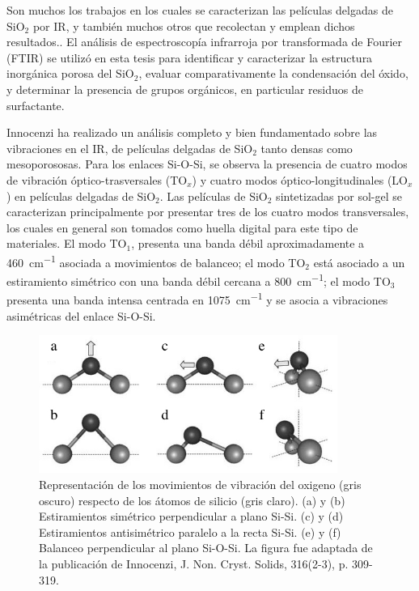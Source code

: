 		 Son muchos los trabajos en los cuales se caracterizan las películas delgadas de SiO$_2$ por IR\cite{Olsen1989,Almeida1990,Redol1997,Innocenzi2003}, y también muchos otros que recolectan y emplean dichos resultados.\cite{Angelome2008,Calvo2008,Calvo20210}.
		 El análisis de espectroscopía infrarroja por transformada de Fourier (FTIR) se utilizó en esta tesis para identificar y caracterizar la estructura inorgánica porosa del SiO$_2$, evaluar comparativamente la condensación del óxido, y determinar la presencia de grupos orgánicos, en particular residuos de surfactante. 

		 Innocenzi ha realizado un análisis completo y bien fundamentado sobre las vibraciones en el IR, de películas delgadas de SiO$_2$ tanto densas como mesoporososas.\cite{Innocenzi2003} Para los enlaces Si-O-Si, se observa la presencia de cuatro modos de vibración óptico-trasversales (TO$_x$) y cuatro modos óptico-longitudinales (LO$_x$) en películas delgadas de SiO$_2$. Las películas de SiO$_2$ sintetizadas por sol-gel se caracterizan principalmente por presentar tres de los cuatro modos transversales, los cuales en general son tomados como huella digital para este tipo de materiales.\cite{Innocenzi2003,Angelome2008,Calvo2008} El modo TO$_1$, presenta una banda débil aproximadamente a \SI{460}{\cm^{-1}} asociada a movimientos de balanceo; el modo TO$_2$ está asociado a un estiramiento simétrico con una banda débil cercana a \SI{800}{\cm^{-1}}; el modo TO$_3$ presenta una banda intensa centrada en \SI{1075}{\cm^{-1}} y se asocia a vibraciones asimétricas del enlace Si-O-Si. 

		 		 \begin{figure}[!t]
						\begin{center}
						\includegraphics[width=0.87\textwidth]{Imagenes/modos-infra.jpg}
						\caption[Modos de vibración Si-O-Si]{Representación de los movimientos de vibración del oxigeno (gris oscuro) respecto de los átomos de silicio (gris claro). (a) y (b) Estiramientos simétrico perpendicular a plano Si-Si. (c) y (d) Estiramientos antisimétrico paralelo a la recta Si-Si. (e) y (f) Balanceo perpendicular al plano Si-O-Si. La figura fue adaptada de la publicación de Innocenzi, J. Non. Cryst. Solids, 316(2-3), p. 309-319.}
						\label{fig:modos-ir}
						\vspace*{-3mm}
						\end{center}
						\end{figure}

